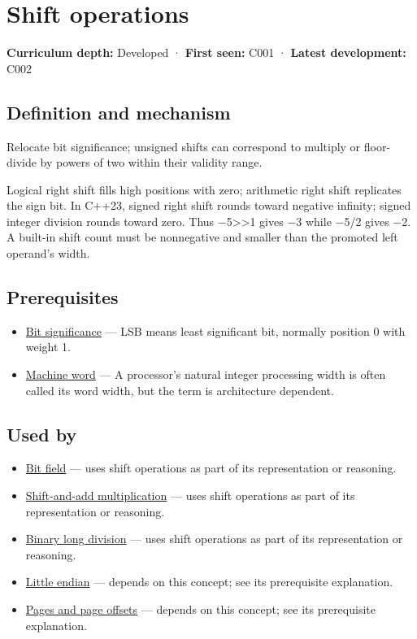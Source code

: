 \hypertarget{appendix-73425b25118e}{}
\section{Shift operations}\label{appendix-73425b25118e-shift-operations}

\textbf{Curriculum depth:} Developed · \textbf{First seen:} C001 · \textbf{Latest development:} C002

\subsection{Definition and mechanism}\label{appendix-73425b25118e-definition-and-mechanism}

Relocate bit significance; unsigned shifts can correspond to multiply or floor-divide by powers of two within their validity range.

Logical right shift fills high positions with zero; arithmetic right shift replicates the sign bit. In C++23, signed right shift rounds toward negative infinity; signed integer division rounds toward zero. Thus −5\textgreater\textgreater1 gives −3 while −5/2 gives −2. A built-in shift count must be nonnegative and smaller than the promoted left operand's width.

\subsection{Prerequisites}\label{appendix-73425b25118e-prerequisites}

\begin{itemize}
\tightlist
\item
  \hyperref[appendix-280445746493]{Bit significance} --- LSB means least significant bit, normally position 0 with weight 1.
\item
  \hyperref[appendix-d67a19507dc5]{Machine word} --- A processor's natural integer processing width is often called its word width, but the term is architecture dependent.
\end{itemize}

\subsection{Used by}\label{appendix-73425b25118e-used-by}

\begin{itemize}
\item
  \hyperref[appendix-ac697f5c66e8]{Bit field} --- uses shift operations as part of its representation or reasoning.
\item
  \hyperref[appendix-a65290d66ed9]{Shift-and-add multiplication} --- uses shift operations as part of its representation or reasoning.
\item
  \hyperref[appendix-89985e6a2685]{Binary long division} --- uses shift operations as part of its representation or reasoning.
\item
  \hyperref[appendix-367b6abf460e]{Little endian} --- depends on this concept; see its prerequisite explanation.
\item
  \hyperref[appendix-0c67cd5bf30a]{Pages and page offsets} --- depends on this concept; see its prerequisite explanation.
\end{itemize}

